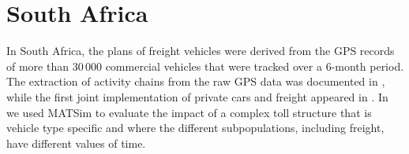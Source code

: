 

%
%
%
%
%

\section{South Africa}
In South Africa, the plans of freight vehicles were derived from the GPS records of more than 30\,000 commercial vehicles  that were tracked over a 6-month period. The extraction of activity chains from the raw GPS data was documented in \citet[][]{JoubertAxhausen_JTG_2011}, while the first joint implementation of private cars and freight appeared in \citet[][]{JoubertJEtAl_TRR_2010}. In \citet[][]{NagelKickhoeferJoubert2014HeterogeneousVoTsPROCEDIA} we used MATSim to evaluate the impact of a complex toll structure that is vehicle type specific and where the different subpopulations, including freight, have different values of time.

